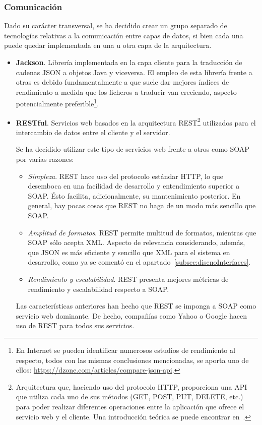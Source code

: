 \subsubsection{Comunicación}

Dado su carácter transversal, se ha decidido crear un grupo separado de tecnologías relativas a la comunicación entre capas de datos, si bien cada una puede quedar implementada en una u otra capa de la arquitectura.

\begin{itemize}
	\item \textbf{Jackson}. Librería implementada en la capa cliente para la traducción de cadenas JSON a objetos Java y viceversa. El empleo de esta librería frente a otras es debido fundamentalmente a que suele dar mejores índices de rendimiento a medida que los ficheros a traducir van creciendo, aspecto potencialmente preferible\footnote{En Internet se pueden identificar numerosos estudios de rendimiento al respecto, todos con las mismas conclusiones mencionadas, se aporta uno de ellos: \url{https://dzone.com/articles/compare-json-api}.}.
	
	\item \textbf{RESTful}. Servicios web basados en la arquitectura REST\footnote{Arquitectura que, haciendo uso del protocolo HTTP, proporciona una API que utiliza cada uno de sus métodos (GET, POST, PUT, DELETE, etc.) para poder realizar diferentes operaciones entre la aplicación que ofrece el servicio web y el cliente. Una introducción teórica se puede encontrar en~\cite{WREST}.} utilizados para el intercambio de datos entre el cliente y el servidor.
		
	Se ha decidido utilizar este tipo de servicios web frente a otros como SOAP por varias razones:
	\begin{itemize}
		\item \textit{Simpleza}. REST hace uso del protocolo estándar HTTP, lo que desemboca en una facilidad de desarrollo y entendimiento superior a SOAP. Ésto facilita, adicionalmente, su mantenimiento posterior. En general, hay pocas cosas que REST no haga de un modo más sencillo que SOAP. 
		\item \textit{Amplitud de formatos}. REST permite multitud de formatos, mientras que SOAP sólo acepta XML. Aspecto de relevancia considerando, además, que JSON es más eficiente y sencillo que XML para el sistema en desarrollo, como ya se comentó en el apartado~\ref{subsec:disenoInterfaces}.
		\item \textit{Rendimiento y escalabilidad}. REST presenta mejores métricas de rendimiento y escalabilidad respecto a SOAP.
	\end{itemize}
	Las características anteriores han hecho que REST se imponga a SOAP como servicio web dominante. De hecho, compañías como Yahoo o Google hacen uso de REST para todos sus servicios.


\end{itemize}

